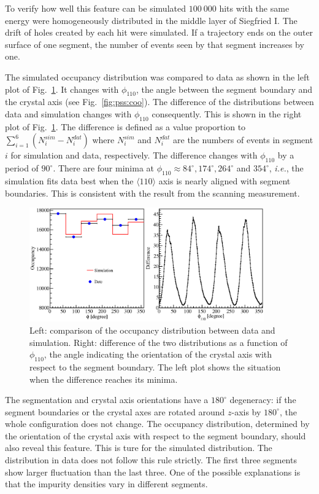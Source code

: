 To verify how well this feature can be simulated $100\ 000$ hits with the same energy were homogeneously distributed in the middle layer of Siegfried I. The drift of holes created by each hit were simulated. If a trajectory ends on the outer surface of one segment, the number of events seen by that segment increases by one. 

The simulated occupancy distribution was compared to data as shown in the left plot of Fig.~\ref{fig:psa:focc}. It changes with $\phi_{110}$, the angle between the segment boundary and the crystal axis (see Fig.~\ref{fig:pss:coo}). The difference of the distributions between data and simulation changes with $\phi_{110}$ consequently. This is shown in the right plot of Fig.~\ref{fig:psa:focc}. The difference is defined as a value proportion to $\sum_{i=1}^{6} (N_{i}^{sim}-N_{i}^{dat})$ where $N_{i}^{sim}$ and $N_{i}^{dat}$ are the numbers of events in segment $i$ for simulation and data, respectively. The difference changes with $\phi_{110}$ by a period of $90^{\circ}$. There are four minima at $\phi_{110} \approx 84^{\circ}, 174^{\circ}, 264^{\circ}$ and $354^{\circ}$, \textit{i.e.}, the simulation fits data best when the $\langle 110 \rangle$ axis is nearly aligned with segment boundaries. This is consistent with the result from the scanning measurement.

\begin{figure}[htbp]
\centering
\includegraphics[width=0.9\textwidth]{fitocc}
\caption{Left: comparison of the occupancy distribution between data and simulation. Right: difference of the two distributions as a function of $\phi_{110}$, the angle indicating the orientation of the crystal axis with respect to the segment boundary. The left plot shows the situation when the difference reaches its minima.}
\label{fig:psa:focc}
\end{figure}

The segmentation and crystal axis orientations have a $180^{\circ}$ degeneracy: if the segment boundaries or the crystal axes are rotated around $z$-axis by $180^{\circ}$, the whole configuration does not change. The occupancy distribution, determined by the orientation of the crystal axis with respect to the segment boundary, should also reveal this feature. This is ture for the simulated distribution. The distribution in data does not follow this rule strictly. The first three segments show larger fluctuation than the last three. One of the possible explanations is that the impurity densities vary in different segments.

